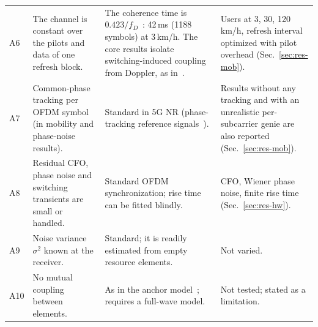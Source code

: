 \begin{table}[!htbp]
{\begin{tabular}{p{0.4cm}p{4.0cm}p{6.6cm}p{4.2cm}}
A6 & The channel is constant over the pilots and data of one refresh block. & The coherence time is $0.423/f_D$~\cite{rappaport2002}: 42\,ms (1188 symbols) at 3\,km/h. The core results isolate switching-induced coupling from Doppler, as in~\cite{iudice2026}. & Users at 3, 30, 120\,km/h, refresh interval optimized with pilot overhead (Sec.~\ref{sec:res-mob}). \\
A7 & Common-phase tracking per OFDM symbol (in mobility and phase-noise results). & Standard in 5G NR (phase-tracking reference signals~\cite{ts38211}). & Results without any tracking and with an unrealistic per-subcarrier genie are also reported (Sec.~\ref{sec:res-mob}). \\
A8 & Residual CFO, phase noise and switching transients are small or handled. & Standard OFDM synchronization; rise time can be fitted blindly. & CFO, Wiener phase noise, finite rise time (Sec.~\ref{sec:res-hw}). \\
A9 & Noise variance $\sigma^2$ known at the receiver. & Standard; it is readily estimated from empty resource elements. & Not varied. \\
A10 & No mutual coupling between elements. & As in the anchor model~\cite{iudice2026}; requires a full-wave model. & Not tested; stated as a limitation. \\\bottomrule
\end{tabular}}
\end{table}
